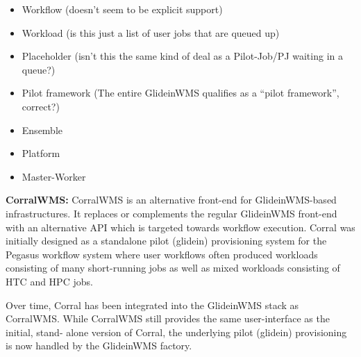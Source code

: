 \documentclass{sig-alternate}
\begin{document}

\begin{itemize}
\item Workflow (doesn't seem to be explicit support)
\item Workload (is this just a list of user jobs that are queued up)
\item Placeholder (isn't this the same kind of deal as a Pilot-Job/PJ
waiting in a queue?)
\item Pilot framework (The entire GlideinWMS qualifies as a ``pilot
framework'', correct?)
\item Ensemble 
\item Platform 
\item Master-Worker 
\end{itemize}

\textbf{CorralWMS:} CorralWMS is an alternative front-end for GlideinWMS-based
infrastructures. It replaces or complements the regular GlideinWMS front-end
with an alternative API which is targeted towards workflow execution. Corral was
initially designed as a standalone pilot (glidein) provisioning system for
the Pegasus workflow system where user  workflows often produced workloads
consisting of many short-running jobs as well as mixed workloads consisting of
HTC and HPC jobs.

Over time, Corral has been integrated into the GlideinWMS stack as CorralWMS.
While CorralWMS still provides the same user-interface as the initial, stand-
alone version of Corral, the underlying pilot (glidein) provisioning is
now handled by the GlideinWMS factory.
\end{document}
